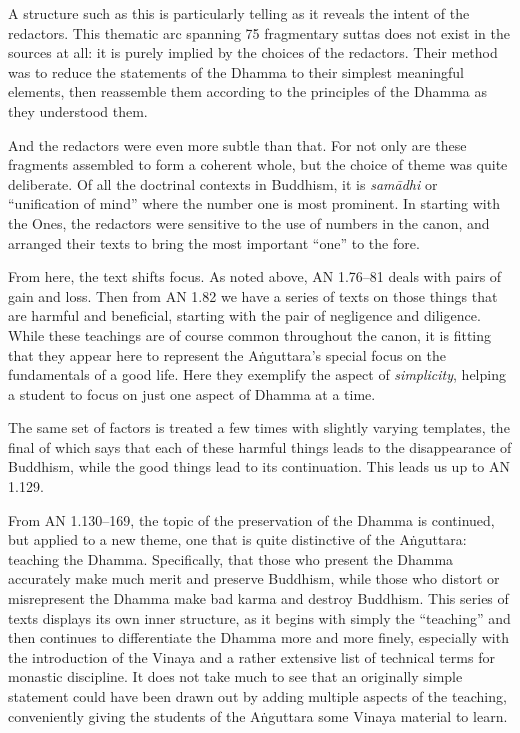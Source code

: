 \documentclass[12pt,openany]{book}%
\begin{document}
A structure such as this is particularly telling as it reveals the intent of the redactors. This thematic arc spanning 75 fragmentary suttas does not exist in the sources at all: it is purely implied by the choices of the redactors. Their method was to reduce the statements of the Dhamma to their simplest meaningful elements, then reassemble them according to the principles of the Dhamma as they understood them.

And the redactors were even more subtle than that. For not only are these fragments assembled to form a coherent whole, but the choice of theme was quite deliberate. Of all the doctrinal contexts in Buddhism, it is \textit{\textsanskrit{samādhi}} or “unification of mind” where the number one is most prominent. In starting with the Ones, the redactors were sensitive to the use of numbers in the canon, and arranged their texts to bring the most important “one” to the fore.

From here, the text shifts focus. As noted above, AN 1.76–81 deals with pairs of gain and loss. Then from AN 1.82 we have a series of texts on those things that are harmful and beneficial, starting with the pair of negligence and diligence. While these teachings are of course common throughout the canon, it is fitting that they appear here to represent the \textsanskrit{Aṅguttara}’s special focus on the fundamentals of a good life. Here they exemplify the aspect of \emph{simplicity}, helping a student to focus on just one aspect of Dhamma at a time.

The same set of factors is treated a few times with slightly varying templates, the final of which says that each of these harmful things leads to the disappearance of Buddhism, while the good things lead to its continuation. This leads us up to AN 1.129.

From AN 1.130–169, the topic of the preservation of the Dhamma is continued, but applied to a new theme, one that is quite distinctive of the \textsanskrit{Aṅguttara}: teaching the Dhamma. Specifically, that those who present the Dhamma accurately make much merit and preserve Buddhism, while those who distort or misrepresent the Dhamma make bad karma and destroy Buddhism. This series of texts displays its own inner structure, as it begins with simply the “teaching” and then continues to differentiate the Dhamma more and more finely, especially with the introduction of the Vinaya and a rather extensive list of technical terms for monastic discipline. It does not take much to see that an originally simple statement could have been drawn out by adding multiple aspects of the teaching, conveniently giving the students of the \textsanskrit{Aṅguttara} some Vinaya material to learn.
\end{document}
